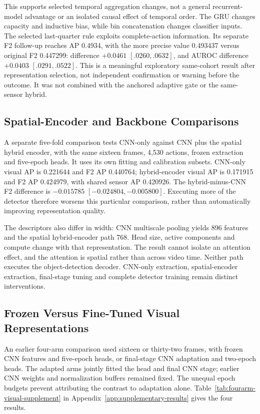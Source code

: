 This supports selected temporal aggregation changes, not a general recurrent-model
advantage or an isolated causal effect of temporal order. The GRU changes capacity and
inductive bias, while bin concatenation changes classifier inputs. The selected
last-quarter rule exploits complete-action information. Its separate F2 follow-up
reaches AP 0.4934, with the more precise value 0.493437 versus original F2 0.447299:
difference $+0.0461$ $[.0260,.0632]$, and AUROC difference $+0.0403$ $[.0291,.0522]$.
This is a meaningful exploratory same-cohort result after representation selection, not
independent confirmation or warning before the outcome. It was not combined with the
anchored adaptive gate or the same-sensor hybrid.

\subsection{Spatial-Encoder and Backbone Comparisons}
A separate five-fold comparison tests CNN-only against CNN plus the spatial hybrid
encoder, with the same sixteen frames, 4,530 actions, frozen extraction and five-epoch
heads. It uses its own fitting and calibration subsets. CNN-only visual AP is 0.221644
and F2 AP 0.440764; hybrid-encoder visual AP is 0.171915 and F2 AP 0.424979, with shared
sensor AP 0.420926. The hybrid-minus-CNN F2 difference is $-0.015785$
$[-0.024804,-0.005800]$. Executing more of the detector therefore worsens this
particular comparison, rather than automatically improving representation
quality.

The descriptors also differ in width: CNN multiscale pooling yields 896 features and the
spatial hybrid-encoder path 768. Head size, active components and compute change with
that representation. The result cannot isolate an attention effect, and the attention is
spatial rather than across video time. Neither path executes the object-detection
decoder. CNN-only extraction, spatial-encoder extraction, final-stage tuning and
complete detector training remain distinct interventions.

\subsection{Frozen Versus Fine-Tuned Visual Representations}
An earlier four-arm comparison used sixteen or thirty-two frames, with frozen CNN
features and five-epoch heads, or final-stage CNN adaptation and two-epoch heads. The
adapted arms jointly fitted the head and final CNN stage; earlier CNN weights and
normalization buffers remained fixed. The unequal epoch budgets prevent attributing the
contrast to adaptation alone. Table~\ref{tab:fourarm-visual-supplement} in
Appendix~\ref{app:supplementary-results} gives the four results.

